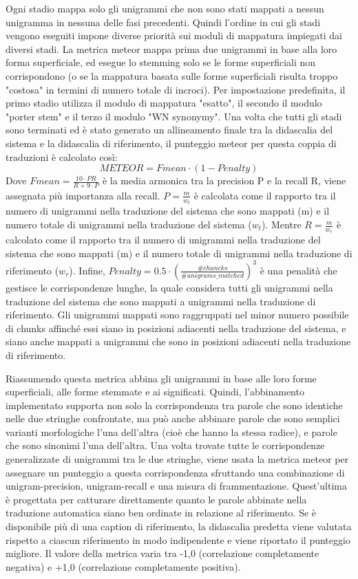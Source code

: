 Ogni stadio mappa solo gli unigrammi che non sono stati mappati a nessun unigramma in nessuna delle fasi precedenti. Quindi l'ordine in cui gli stadi vengono eseguiti impone diverse priorità sui moduli di mappatura impiegati dai diversi stadi. La metrica \acrshort{meteor} mappa prima due unigrammi in base alla loro forma superficiale, ed esegue lo stemming solo se le forme superficiali non corrispondono (o se la mappatura basata sulle forme superficiali risulta troppo "costosa" in termini di numero totale di incroci). Per impostazione predefinita, il primo stadio utilizza il modulo di mappatura "esatto", il secondo il modulo "porter stem" e il terzo il modulo "WN synonymy".
Una volta che tutti gli stadi sono terminati ed è stato generato un allineamento finale tra la didascalia del sistema e la didascalia di riferimento, il punteggio \acrshort{meteor} per questa coppia di traduzioni è calcolato così:
\begin{equation*}
METEOR = Fmean \cdot (1 - Penalty)
\end{equation*}
Dove $Fmean = \frac{10\cdot PR}{R+9\cdot P}$ è la media armonica tra la precision P e la recall R, viene assegnata più importanza alla recall.
$P = \frac{m}{w_t}$ è calcolata come il rapporto tra il numero di unigrammi nella traduzione del sistema che sono mappati (m) e il numero totale di unigrammi nella traduzione del sistema ($w_t$). Mentre $R = \frac{m}{w_r}$ è calcolato come il rapporto tra il numero di unigrammi nella traduzione del sistema che sono mappati (m) e il numero totale di unigrammi nella traduzione di riferimento ($w_r$).
Infine, $Penalty = 0.5 \cdot (\frac{\#chuncks}{\#unigrams\_matched})^3$ è una penalità che gestisce le corrispondenze lunghe, la quale considera tutti gli unigrammi nella traduzione del sistema che sono mappati a unigrammi nella traduzione di riferimento. Gli unigrammi mappati sono raggruppati nel minor numero possibile di chunks affinché essi siano in posizioni adiacenti nella traduzione del sistema, e siano anche mappati a unigrammi che sono in posizioni adiacenti nella traduzione di riferimento. 


Riassumendo questa metrica abbina gli unigrammi in base alle loro forme superficiali, alle forme stemmate e ai significati. Quindi, l'abbinamento implementato supporta non solo la corrispondenza tra parole che sono identiche nelle due stringhe confrontate, ma può anche abbinare parole che sono semplici varianti morfologiche l'una dell'altra (cioè che hanno la stessa radice), e parole che sono sinonimi l'una dell'altra. Una volta trovate tutte le corrispondenze generalizzate di unigrammi tra le due stringhe, viene usata la metrica \acrshort{meteor} per assegnare un punteggio a questa corrispondenza sfruttando una combinazione di unigram-precision, unigram-recall e una misura di frammentazione. Quest'ultima è progettata per catturare direttamente quanto le parole abbinate nella traduzione automatica siano ben ordinate in relazione al riferimento.
Se è disponibile più di una caption di riferimento, la didascalia predetta viene valutata rispetto a ciascun riferimento in modo indipendente e viene riportato il punteggio migliore.
Il valore della metrica varia tra -1,0 (correlazione completamente negativa) e +1,0 (correlazione completamente positiva). 

